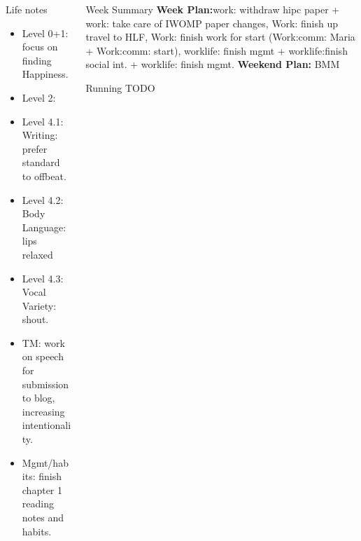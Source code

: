 \documentclass[serif, mathserif, final]{beamer}
\begin{document}
\begin{frame}{}
\begin{columns}
\begin{column}{0.25\linewidth}
      \begin{block}{Life notes} 
        \begin{itemize} 
          \tiny \item \tiny Level 0+1: focus on finding Happiness. 
        \item \tiny Level 2: 
        \item \tiny Level 4.1: Writing: prefer standard to offbeat. 
        \item \tiny Level 4.2: Body Language: lips relaxed
        \item \tiny Level 4.3: Vocal Variety: shout. 
        \item \tiny TM: work on speech for submission to blog, increasing intentionality. 
        \item \tiny Mgmt/habits: finish chapter 1 reading notes and habits. 
        \end{itemize}     
      \end{block}
    \end{column} %
    
    \begin{column}{0.50\linewidth}
      \begin{block}{Week Summary} 
        {\tiny \textbf{Week Plan:}work: withdraw hipc paper + work:
          take care of IWOMP paper changes, Work: finish up travel
          to HLF, Work: finish work for start (Work:comm: Maria +
          Work:comm: start), worklife: finish mgmt + worklife:finish
          social int. + worklife: finish mgmt. }
        {\tiny \textbf{Weekend Plan:} BMM } 

      \end{block}
      
      \begin{block}{Running TODO} %


        

\end{block}
\end{column}
\end{columns}
\end{frame}
\end{document}
